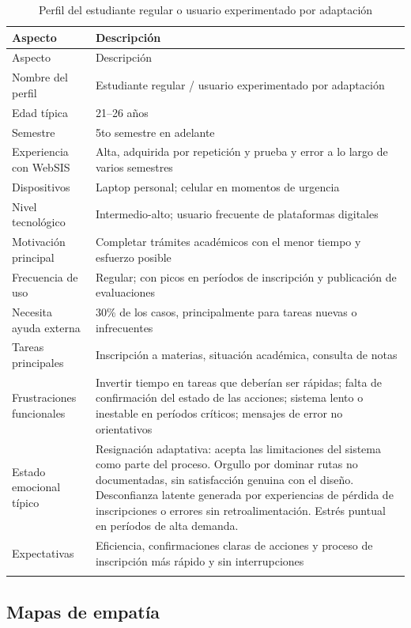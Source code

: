 \begin{longtable}{|p{4.5cm}|p{9cm}|}
\hline
Aspecto & Descripción \\
\hline
\endfirsthead

\hline
Aspecto & Descripción \\
\hline
\endhead

Nombre del perfil & Estudiante regular / usuario experimentado por adaptación \\
Edad típica & 21--26 años \\
Semestre & 5to semestre en adelante \\
Experiencia con WebSIS & Alta, adquirida por repetición y prueba y error a lo largo de varios semestres \\
Dispositivos & Laptop personal; celular en momentos de urgencia \\
Nivel tecnológico & Intermedio-alto; usuario frecuente de plataformas digitales \\
Motivación principal & Completar trámites académicos con el menor tiempo y esfuerzo posible \\
Frecuencia de uso & Regular; con picos en períodos de inscripción y publicación de evaluaciones \\
Necesita ayuda externa & 30\% de los casos, principalmente para tareas nuevas o infrecuentes \\
Tareas principales & Inscripción a materias, situación académica, consulta de notas \\
Frustraciones funcionales & Invertir tiempo en tareas que deberían ser rápidas; falta de confirmación del estado de las acciones; sistema lento o inestable en períodos críticos; mensajes de error no orientativos \\
Estado emocional típico & Resignación adaptativa: acepta las limitaciones del sistema como parte del proceso. Orgullo por dominar rutas no documentadas, sin satisfacción genuina con el diseño. Desconfianza latente generada por experiencias de pérdida de inscripciones o errores sin retroalimentación. Estrés puntual en períodos de alta demanda. \\
Expectativas & Eficiencia, confirmaciones claras de acciones y proceso de inscripción más rápido y sin interrupciones \\
\hline
\caption{Perfil del estudiante regular o usuario experimentado por adaptación}\label{tab:perfil-avanzado-adaptacion}
\end{longtable}

\newpage
\subsection{Mapas de empatía}

